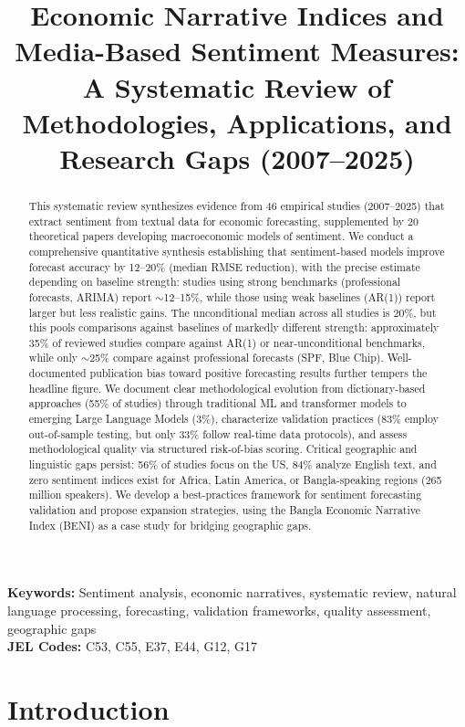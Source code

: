 \documentclass[11pt]{article}
\title{\textbf{Economic Narrative Indices and Media-Based Sentiment Measures:\\
A Systematic Review of Methodologies, Applications, and Research Gaps (2007--2025)}}
\author{} %
\date{}
\begin{document}
\maketitle

\begin{abstract}
This systematic review synthesizes evidence from 46 empirical studies (2007--2025) that extract sentiment from textual data for economic forecasting, supplemented by 20 theoretical papers developing macroeconomic models of sentiment. We conduct a comprehensive quantitative synthesis establishing that sentiment-based models improve forecast accuracy by 12--20\% (median RMSE reduction), with the precise estimate depending on baseline strength: studies using strong benchmarks (professional forecasts, ARIMA) report $\sim$12--15\%, while those using weak baselines (AR(1)) report larger but less realistic gains. The unconditional median across all studies is 20\%, but this pools comparisons against baselines of markedly different strength: approximately 35\% of reviewed studies compare against AR(1) or near-unconditional benchmarks, while only $\sim$25\% compare against professional forecasts (SPF, Blue Chip). Well-documented publication bias toward positive forecasting results further tempers the headline figure. We document clear methodological evolution from dictionary-based approaches (55\% of studies) through traditional ML and transformer models to emerging Large Language Models (3\%), characterize validation practices (83\% employ out-of-sample testing, but only 33\% follow real-time data protocols), and assess methodological quality via structured risk-of-bias scoring. Critical geographic and linguistic gaps persist: 56\% of studies focus on the US, 84\% analyze English text, and zero sentiment indices exist for Africa, Latin America, or Bangla-speaking regions (265 million speakers). We develop a best-practices framework for sentiment forecasting validation and propose expansion strategies, using the Bangla Economic Narrative Index (BENI) as a case study for bridging geographic gaps.
\end{abstract}

\noindent \textbf{Keywords:} Sentiment analysis, economic narratives, systematic review, natural language processing, forecasting, validation frameworks, quality assessment, geographic gaps \\
\textbf{JEL Codes:} C53, C55, E37, E44, G12, G17

\section{Introduction}
\end{document}

